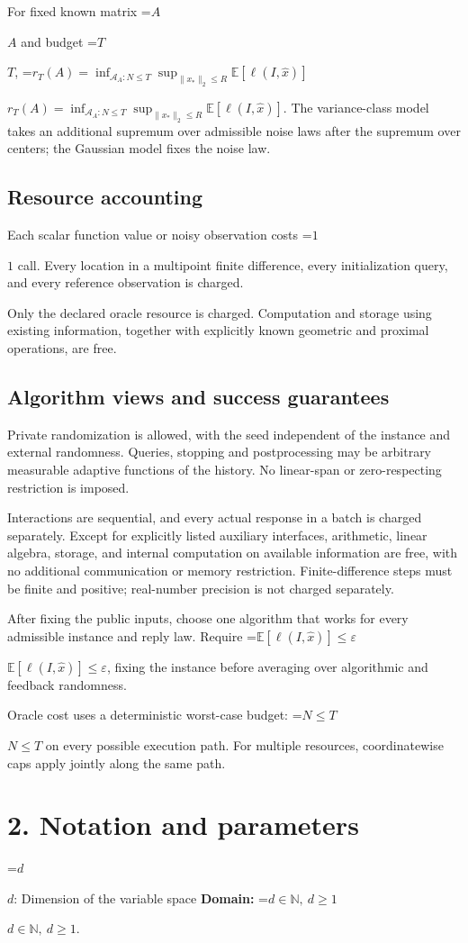 \documentclass[10pt,a4paper]{article}
\newcommand{\AtlasMath}[1]{\par\begingroup\centering\setbox0=\hbox{$\displaystyle #1$}\ifdim\wd0>1.4\linewidth\typeout{ATLAS WIDE FORMULA: \the\wd0}\fi\ifdim\wd0>\linewidth\resizebox{\linewidth}{!}{\box0}\else\box0\fi\par\endgroup}
\newcommand{\AtlasInlineMath}[1]{\begingroup\setbox0=\hbox{$#1$}\ifdim\wd0>.4\linewidth\endgroup\AtlasMath{#1}\else\endgroup$#1$\fi}
\begin{document}
For fixed known matrix \AtlasInlineMath{A} and budget \AtlasInlineMath{T}, \AtlasInlineMath{r_T(A)=\inf_{\mathcal{A}_A:N\le T}\sup_{\|x_*\|_2\le R}\mathbb{E}[\ell(I,\widehat{x})]}. The variance-class model takes an additional supremum over admissible noise laws after the supremum over centers; the Gaussian model fixes the noise law.

\subsection{Resource accounting}
Each scalar function value or noisy observation costs \AtlasInlineMath{1} call. Every location in a multipoint finite difference, every initialization query, and every reference observation is charged.

Only the declared oracle resource is charged. Computation and storage using existing information, together with explicitly known geometric and proximal operations, are free.

\subsection{Algorithm views and success guarantees}
Private randomization is allowed, with the seed independent of the instance and external randomness. Queries, stopping and postprocessing may be arbitrary measurable adaptive functions of the history. No linear-span or zero-respecting restriction is imposed.

Interactions are sequential, and every actual response in a batch is charged separately. Except for explicitly listed auxiliary interfaces, arithmetic, linear algebra, storage, and internal computation on available information are free, with no additional communication or memory restriction. Finite-difference steps must be finite and positive; real-number precision is not charged separately.

After fixing the public inputs, choose one algorithm that works for every admissible instance and reply law. Require \AtlasInlineMath{\mathbb{E}[\ell(I,\widehat{x})]\le \varepsilon}, fixing the instance before averaging over algorithmic and feedback randomness.

Oracle cost uses a deterministic worst-case budget: \AtlasInlineMath{N\le T} on every possible execution path. For multiple resources, coordinatewise caps apply jointly along the same path.

\section{2. Notation and parameters}
\AtlasInlineMath{d}: Dimension of the variable space \textbf{Domain:} \AtlasInlineMath{d\in\mathbb{N},\ d\ge1}.
\end{document}
